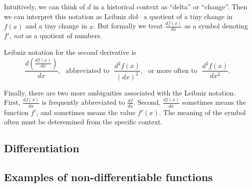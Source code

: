 Intuitively, we can think of $d$ in a historical context as ``delta''
or ``change''. Then we can interpret this notation as Leibniz did-- a
quotient of a tiny change in $f(x)$ and a tiny change in $x$. But
formally we treat $\frac{df(x)}{dx}$ as a symbol denoting $f'$,
\textit{not} as a quotient of numbers.

\vs

Leibniz notation for the second derivative is
\[\frac{d\left(\frac{df(x)}{dx}\right)}{dx},\ \ \ \text{abbreviated
    to}\ \ \ \frac{d^2f(x)}{(dx)^2}, \ \ \ \text{or more often to}\ \
  \ \frac{d^2f(x)}{dx^2}.\]

Finally, there are two more ambiguities associated with the Leibniz
notation. First, $\frac{df(x)}{dx}$ is frequently abbreviated to
$\frac{df}{dx}$. Second, $\frac{df(x)}{dx}$ sometimes means the
function $f'$, and sometimes means the value $f'(x)$. The meaning of
the symbol often must be deteremined from the specific context.

\subsection{Differentiation}
  
\subsection{Examples of non-differentiable functions}
  
